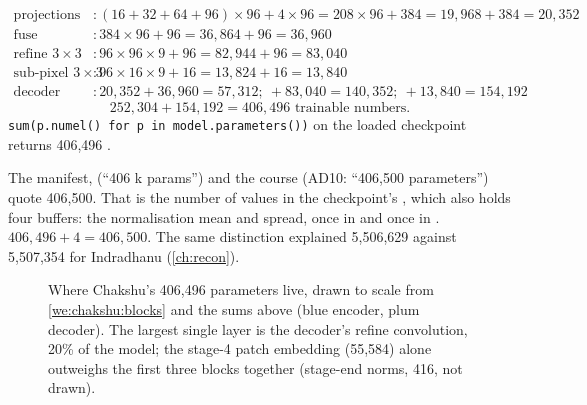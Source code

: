 \begin{align*}
\text{projections} &: (16+32+64+96)\times96+4\times96 = 208\times96+384 = 19{,}968+384 = 20{,}352\\
\text{fuse} &: 384\times96+96 = 36{,}864+96 = 36{,}960\\
\text{refine } 3\times3 &: 96\times96\times9+96 = 82{,}944+96 = 83{,}040\\
\text{sub-pixel } 3\times3 &: 96\times16\times9+16 = 13{,}824+16 = 13{,}840\\
\text{decoder} &: 20{,}352+36{,}960 = 57{,}312;\ +83{,}040 = 140{,}352;\ +13{,}840 = 154{,}192
\end{align*}
\begin{equation}\label{eq:chakshu:total}
252{,}304+154{,}192 = 406{,}496 \text{ trainable numbers.}
\end{equation}
\lstinline!sum(p.numel() for p in model.parameters())! on the loaded checkpoint returns 406,496 \tagC.

\begin{sourcenote}
The manifest,  (``406 k params'') and the course (AD10: ``406,500 parameters'') quote 406,500.
That is the number of values in the checkpoint's , which also holds four buffers: the normalisation
mean and spread, once in  and once in . $406{,}496+4=406{,}500$. The
same distinction explained 5,506,629 against 5,507,354 for Indradhanu (\cref{ch:recon}).
\end{sourcenote}

\begin{figure}[htbp]\centering
{}
\caption{Where Chakshu's 406,496 parameters live, drawn to scale from \cref{we:chakshu:blocks} and the sums above
(blue encoder, plum decoder). The largest single layer is the decoder's refine convolution, 20\% of the model; the
stage-4 patch embedding (55,584) alone outweighs the first three blocks together (stage-end norms, 416, not drawn).}
\label{fig:chakshu:params}
\end{figure}

